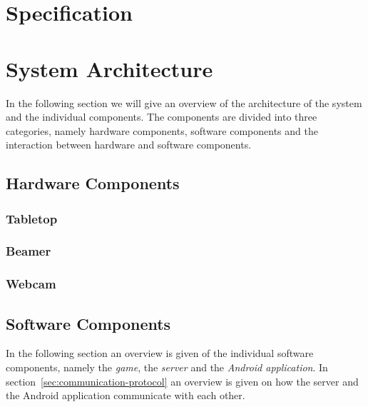 \documentclass[a4paper,10pt]{article}
\begin{document}
\section{Specification}

\section{System Architecture}
\label{sec:system-architecture}
In the following section we will give an overview of the architecture of the system and the individual components.
The components are divided into three categories, namely hardware components, software components and the interaction between hardware and software components.

	\subsection{Hardware Components}
		
		\subsubsection{Tabletop}
		
		\subsubsection{Beamer}
		
		\subsubsection{Webcam}


	\subsection{Software Components}
	\label{sec:software-components}
	In the following section an overview is given of the individual software components, namely the \emph{game}, the \emph{server} and the \emph{Android application}.
	In section~\ref{sec:communication-protocol} an overview is given on how the server and the Android application communicate with each other.
\end{document}
